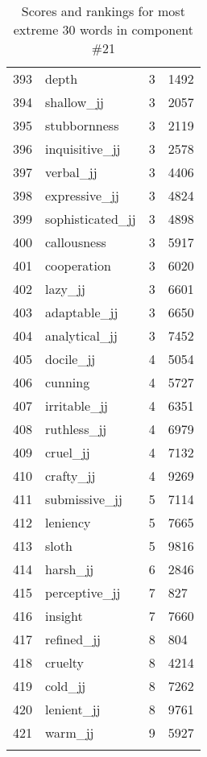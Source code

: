 \begin{longtable}[!htbp]{| rlr@{.}l |}
    393 & depth & 3 & 1492 \\
    394 & shallow\_jj & 3 & 2057 \\
    395 & stubbornness & 3 & 2119 \\
    396 & inquisitive\_jj & 3 & 2578 \\
    397 & verbal\_jj & 3 & 4406 \\
    398 & expressive\_jj & 3 & 4824 \\
    399 & sophisticated\_jj & 3 & 4898 \\
    400 & callousness & 3 & 5917 \\
    401 & cooperation & 3 & 6020 \\
    402 & lazy\_jj & 3 & 6601 \\
    403 & adaptable\_jj & 3 & 6650 \\
    404 & analytical\_jj & 3 & 7452 \\
    405 & docile\_jj & 4 & 5054 \\
    406 & cunning & 4 & 5727 \\
    407 & irritable\_jj & 4 & 6351 \\
    408 & ruthless\_jj & 4 & 6979 \\
    409 & cruel\_jj & 4 & 7132 \\
    410 & crafty\_jj & 4 & 9269 \\
    411 & submissive\_jj & 5 & 7114 \\
    412 & leniency & 5 & 7665 \\
    413 & sloth & 5 & 9816 \\
    414 & harsh\_jj & 6 & 2846 \\
    415 & perceptive\_jj & 7 & 827 \\
    416 & insight & 7 & 7660 \\
    417 & refined\_jj & 8 & 804 \\
    418 & cruelty & 8 & 4214 \\
    419 & cold\_jj & 8 & 7262 \\
    420 & lenient\_jj & 8 & 9761 \\
    421 & warm\_jj & 9 & 5927 \\
    \hline
    \caption{Scores and rankings for most extreme 30 words in component \#21} \\
\end{longtable}
